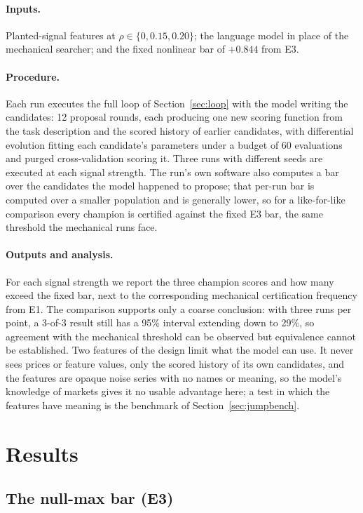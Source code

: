 \documentclass[11pt]{article}
\begin{document}
\paragraph{Inputs.} Planted-signal features at $\rho \in \{0, 0.15, 0.20\}$; the language model in place
of the mechanical searcher; and the fixed nonlinear bar of $+0.844$ from E3.

\paragraph{Procedure.} Each run executes the full loop of Section~\ref{sec:loop} with the model writing
the candidates: 12 proposal rounds, each producing one new scoring function from the task description and
the scored history of earlier candidates, with differential evolution fitting each candidate's parameters
under a budget of 60 evaluations and purged cross-validation scoring it. Three runs with different seeds
are executed at each signal strength. The run's own software also computes a bar over the candidates the
model happened to propose; that per-run bar is computed over a smaller population and is generally lower,
so for a like-for-like comparison every champion is certified against the fixed E3 bar, the same
threshold the mechanical runs face.

\paragraph{Outputs and analysis.} For each signal strength we report the three champion scores and how
many exceed the fixed bar, next to the corresponding mechanical certification frequency from E1. The
comparison supports only a coarse conclusion: with three runs per point, a 3-of-3 result still has a
95\% interval extending down to 29\%, so agreement with the mechanical threshold can be observed but
equivalence cannot be established. Two features of the design limit what the model can use. It never sees
prices or feature values, only the scored history of its own candidates, and the features are opaque
noise series with no names or meaning, so the model's knowledge of markets gives it no usable advantage
here; a test in which the features have meaning is the benchmark of Section~\ref{sec:jumpbench}.
\section{Results}
\label{sec:results}

\subsection{The null-max bar (E3)}
\label{sec:e3}
\end{document}
